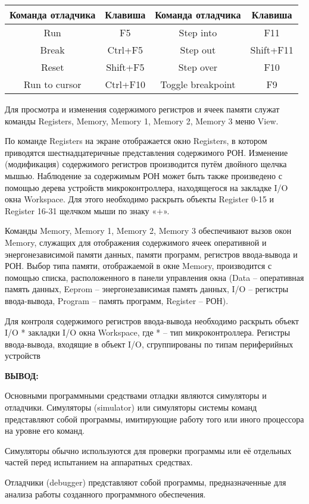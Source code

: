 \documentclass[14pt,a4paper]{extreport}
\newcommand{\header}[1]{%
{
\clearpage%
\fontsize{16pt}{14pt}\selectfont
\begin{center}
\textbf{\MakeUppercase{#1}:}
\end{center}
}
}
\begin{document}
\begin{center}
\begin{tabular}{|c|c|c|c|}
\hline
Команда отладчика&Клавиша&Команда отладчика & Клавиша\\
\hline
Run&F5&Step into&F11\\
\hline
Break&Ctrl+F5&Step out&Shift+F11\\
\hline
Reset&Shift+F5&Step over&F10\\
\hline
Run to cursor&Ctrl+F10&Toggle breakpoint&F9\\
\hline
\end{tabular}
\end{center}

\vspace{30pt}

	Для просмотра и изменения содержимого регистров и ячеек памяти служат команды Registers, Memory, Memory 1, Memory 2, Memory 3 меню View.

	По команде Registers на экране отображается окно Registers, в котором приводятся шестнадцатеричные представления содержимого РОН. Изменение (модификация) содержимого регистров производится путём двойного щелчка мышью. Наблюдение за содержимым РОН может быть также произведено с помощью дерева устройств микроконтроллера, находящегося на закладке I/O окна Workspace. Для этого необходимо раскрыть объекты Register 0-15 и
Register 16-31 щелчком мыши по знаку «+».
	
	Команды Memory, Memory 1, Memory 2, Memory 3 обеспечивают вызов окон Memory, служащих для отображения содержимого ячеек оперативной и энергонезависимой памяти данных, памяти программ, регистров ввода-вывода и РОН. Выбор типа памяти, отображаемой в окне Memory, производится с помощью списка, расположенного в панели управления окна (Data – оперативная память данных, Eeprom – энергонезависимая память данных, I/O – регистры ввода-вывода, Program – память программ, Register – РОН).
	
	Для контроля содержимого регистров ввода-вывода необходимо раскрыть объект I/O * закладки I/O окна Workspace, где * – тип микроконтроллера. Регистры ввода-вывода, входящие в объект I/O, сгруппированы по типам периферийных устройств

\header{Вывод}

	Основными программными средствами отладки являются симуляторы и отладчики. Симуляторы (simulator) или симуляторы системы команд представляют собой программы, имитирующие работу того или иного процессора на уровне его команд. 
	
	Симуляторы обычно используются для проверки программы или её отдельных частей перед испытанием на аппаратных средствах. 
	
	Отладчики (debugger) представляют собой программы, предназначенные для анализа работы созданного программного обеспечения.
\end{document}
